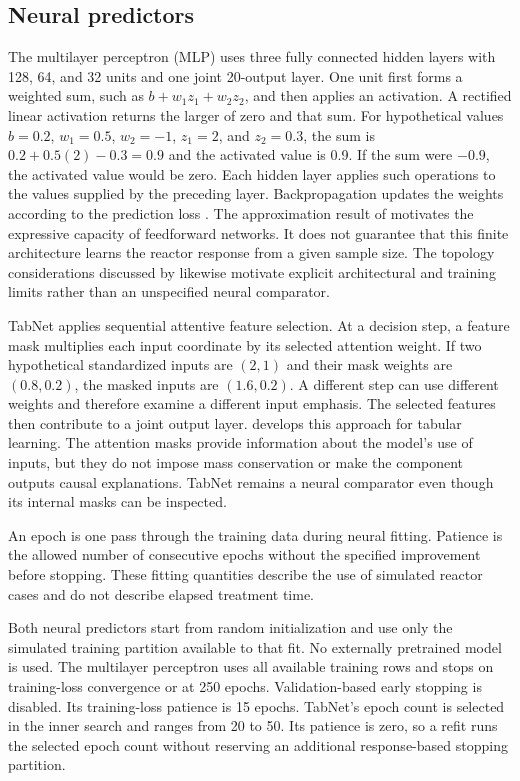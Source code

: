 \subsection{Neural predictors}

The multilayer perceptron (MLP) uses three fully connected hidden layers with 128, 64, and 32 units and one joint 20-output layer. One unit first forms a weighted sum, such as $b+w_1z_1+w_2z_2$, and then applies an activation. A rectified linear activation returns the larger of zero and that sum. For hypothetical values $b=0.2$, $w_1=0.5$, $w_2=-1$, $z_1=2$, and $z_2=0.3$, the sum is $0.2+0.5(2)-0.3=0.9$ and the activated value is 0.9. If the sum were $-0.9$, the activated value would be zero. Each hidden layer applies such operations to the values supplied by the preceding layer. Backpropagation updates the weights according to the prediction loss \citep{Rumelhart1986}. The approximation result of \citet{Hornik1989} motivates the expressive capacity of feedforward networks. It does not guarantee that this finite architecture learns the reactor response from a given sample size. The topology considerations discussed by \citet{Curteanu2011} likewise motivate explicit architectural and training limits rather than an unspecified neural comparator.

TabNet applies sequential attentive feature selection. At a decision step, a feature mask multiplies each input coordinate by its selected attention weight. If two hypothetical standardized inputs are $(2,1)$ and their mask weights are $(0.8,0.2)$, the masked inputs are $(1.6,0.2)$. A different step can use different weights and therefore examine a different input emphasis. The selected features then contribute to a joint output layer. \citet{ArikPfister2021} develops this approach for tabular learning. The attention masks provide information about the model's use of inputs, but they do not impose mass conservation or make the component outputs causal explanations. TabNet remains a neural comparator even though its internal masks can be inspected.

An epoch is one pass through the training data during neural fitting. Patience is the allowed number of consecutive epochs without the specified improvement before stopping. These fitting quantities describe the use of simulated reactor cases and do not describe elapsed treatment time.

Both neural predictors start from random initialization and use only the simulated training partition available to that fit. No externally pretrained model is used. The multilayer perceptron uses all available training rows and stops on training-loss convergence or at 250 epochs. Validation-based early stopping is disabled. Its training-loss patience is 15 epochs. TabNet's epoch count is selected in the inner search and ranges from 20 to 50. Its patience is zero, so a refit runs the selected epoch count without reserving an additional response-based stopping partition.

